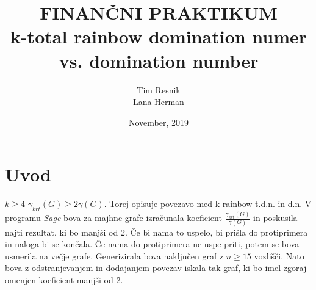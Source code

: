 \documentclass[a4paper]{article}
\title{FINANČNI PRAKTIKUM \\\vspace{3cm} {\huge k-total rainbow domination numer vs. domination number}\vspace{3cm}}
\author{Tim Resnik \\[1.5mm] Lana Herman \\[1.5mm]\vspace{7cm}}
\date{November, 2019}
\begin{document}
\begin{titlepage}
\clearpage \maketitle
\thispagestyle{empty}
\end{titlepage} 

\maketitle
\section{Uvod}
 $k \geq 4$  $\gamma_{krt}(G) \geq 2\gamma(G)$. Torej opisuje povezavo med k-rainbow t.d.n. in d.n. V programu \textit{Sage} bova za majhne grafe izračunala koeficient $\frac{\gamma_{krt}(G)}{\gamma(G)}$ in poskusila najti rezultat, ki bo manjši od 2. Če  bi nama to uspelo, bi prišla do protiprimera in naloga bi se končala. Če nama do protiprimera ne uspe priti, potem se bova usmerila na večje grafe. Generizirala bova naključen graf z $n \geq 15$ vozlišči. Nato bova z odstranjevanjem in dodajanjem povezav iskala tak graf, ki bo imel zgoraj omenjen koeficient manjši od 2.
\end{document}

